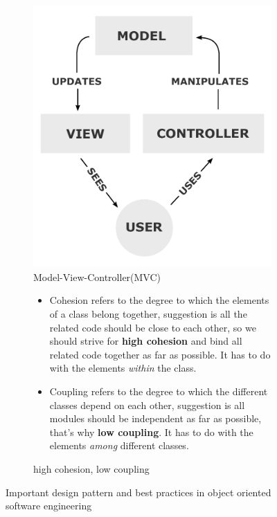 \begin{figure}
\centering
\begin{subfigure}[b]{0.3\textwidth}
\includegraphics[width=\textwidth]{fig/MVC-Process}
	\caption{Model-View-Controller(MVC)\footnotemark}
	\label{fig:mvc}
\end{subfigure}
\begin{subfigure}[b]{0.68\textwidth}
\begin{small}
\begin{ssfont}
\begin{itemize}
\item Cohesion refers to the degree to which the elements of a class belong together, suggestion is all the related code should be close to each other, so we should strive for \textbf{high cohesion} and bind all related code together as far as possible. It has to do with the elements \textit{within} the class. %
\item Coupling refers to the degree to which the different classes depend on each other, suggestion is all modules should be independent as far as possible, that's why \textbf{low coupling}. It has to do with the elements \textit{among} different classes. %
\end{itemize}
\end{ssfont}
\end{small}
\caption{high cohesion, low coupling\footnotemark}
\label{fig:coh}
\end{subfigure}
\caption{Important design pattern and best practices in object oriented software engineering}
\label{fig:patterns}
\end{figure}

